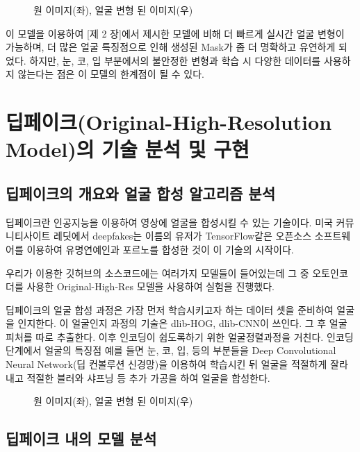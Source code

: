 \documentclass{oblivoir}
\begin{document}
\begin{figure}[h!]
\centering
\caption{원 이미지(좌), 얼굴 변형 된 이미지(우)}
\end{figure}



이 모델을 이용하여 [제 2 장]에서 제시한 모델에 비해 더 빠르게 실시간 얼굴 변형이 가능하며, 더 많은 얼굴 특징점으로 인해 생성된 Mask가 좀 더 명확하고 유연하게 되었다. 하지만, 눈, 코, 입 부분에서의 불안정한 변형과 학습 시 다양한 데이터를 사용하지 않는다는 점은 이 모델의 한계점이 될 수 있다.

\chapter{딥페이크(Original-High-Resolution Model)의 기술 분석 및 구현}

\section{ 딥페이크의 개요와 얼굴 합성 알고리즘 분석}

딥페이크란 인공지능을 이용하여 영상에 얼굴을 합성시킬 수 있는 기술이다. 미국 커뮤니티사이트 레딧에서 deepfakes는 이름의 유저가 TensorFlow같은 오픈소스 소프트웨어를 이용하여 유명연예인과 포르노를 합성한 것이 이 기술의 시작이다.

우리가 이용한 \cite{reference11} 깃허브의 소스코드에는 여러가지 모델들이 들어있는데 그 중 오토인코더를 사용한 Original-High-Res 모델을 사용하여 실험을 진행했다.

딥페이크의 얼굴 합성 과정은 가장 먼저 학습시키고자 하는 데이터 셋을 준비하여 얼굴을 인지한다. 이 얼굴인지 과정의 기술은 dlib-HOG, dlib-CNN이 쓰인다. 그 후 얼굴 피처를 따로 추출한다. 이후 인코딩이 쉽도록하기 위한 얼굴정렬과정을 거친다. 인코딩 단계에서 얼굴의 특징점 예를 들면 눈, 코, 입, 등의 부분들을 Deep Convolutional Neural Network(딥 컨볼루션 신경망)을 이용하여 학습시킨 뒤 얼굴을 적절하게 잘라내고 적절한 블러와 샤프닝 등 추가 가공을 하여 얼굴을 합성한다.


\begin{figure}[h!]
\centering
\caption{원 이미지(좌), 얼굴 변형 된 이미지(우)}
\end{figure}


\section{ 딥페이크 내의 모델 분석}
\end{document}
